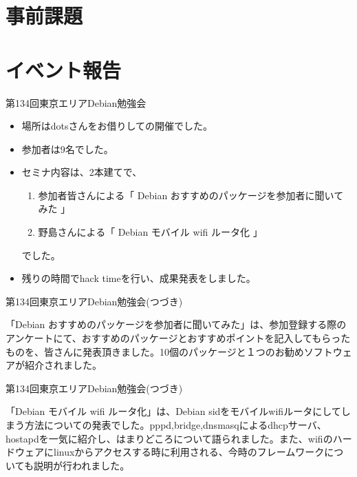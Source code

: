 \section{事前課題}
{\footnotesize
 
}

\section{イベント報告}

\begin{frame}{第134回東京エリアDebian勉強会 }

\begin{itemize}
\item 場所はdotsさんをお借りしての開催でした。
\item 参加者は9名でした。
\item セミナ内容は、2本建てで、
  \begin{enumerate}
  \item 参加者皆さんによる「 Debian おすすめのパッケージを参加者に聞いてみた 」
  \item 野島さんによる「 Debian モバイル wifi ルータ化 」
  \end{enumerate}
でした。
\item 残りの時間でhack timeを行い、成果発表をしました。
\end{itemize} 
\end{frame}

\begin{frame}{第134回東京エリアDebian勉強会(つづき)}

  「Debian おすすめのパッケージを参加者に聞いてみた」は、参加登録する際のアンケートにて、おすすめのパッケージとおすすめポイントを記入してもらったものを、皆さんに発表頂きました。10個のパッケージと１つのお勧めソフトウェアが紹介されました。

\end{frame}

\begin{frame}{第134回東京エリアDebian勉強会(つづき)}

  「Debian モバイル wifi ルータ化」は、Debian sidをモバイルwifiルータにしてしまう方法についての発表でした。pppd,bridge,dnsmasqによるdhcpサーバ、hostapdを一気に紹介し、はまりどころについて語られました。また、wifiのハードウェアにlinuxからアクセスする時に利用される、今時のフレームワークについても説明が行われました。

\end{frame}

